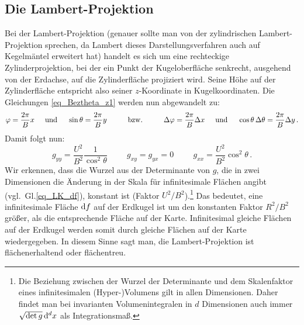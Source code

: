 \subsection{Die Lambert-Projektion}
\label{sec_Lambert}

Bei der Lambert-Projektion 
(genauer sollte man von der zylindrischen Lambert-Projektion sprechen, da Lambert
dieses Darstellungsverfahren auch auf Kegelm\"antel erweitert hat) 
handelt es sich um eine rechteckige Zylinderprojektion, bei der ein Punkt
der Kugeloberfl\"ache senkrecht, ausgehend von der Erdachse, auf die Zylinderfl\"ache projiziert wird. 
Seine H\"ohe auf der Zylinderfl\"ache entspricht also seiner $z$-Koordinate in Kugelkoordinaten. 
Die Gleichungen \ref{eq_Beztheta_z1} werden nun abgewandelt zu:
\begin{equation}
\label{eq_Beztheta_z2}
         \varphi = \frac{2\pi}{B} x  \hspace{0.5cm} {\rm und} \hspace{0.5cm} 
         \sin \theta = \frac{2\pi}{B} y \hspace{1cm} {\rm bzw.} \hspace{1cm}
        \Delta \varphi = \frac{2\pi}{B} \Delta x \hspace{0.5cm} {\rm und} \hspace{0.5cm}  
        \cos \theta \, \Delta \theta = \frac{2\pi}{B} \Delta y  \, .
\end{equation}
Damit folgt nun:
\begin{equation}
         g_{yy} = \frac{U^2}{B^2} \frac{1}{\cos^2 \theta} \hspace{1cm}   g_{xy} = g_{yx} = 0 
         \hspace{1cm}  g_{xx} = \frac{U^2}{B^2} \cos^2 \theta \, .
\end{equation}
Wir erkennen, dass die Wurzel aus der Determinante von $g$, die in zwei Dimensionen die \"Anderung in
der Skala f\"ur infinitesimale Fl\"achen angibt (vgl.\ Gl.\ref{eq_LK_df}), 
konstant ist (Faktor $U^2/B^2$).\footnote{Die Beziehung zwischen der Wurzel der Determinante und
dem Skalenfaktor eines infinitesimalen (Hyper-)Volumens gilt in allen Dimensionen. Daher findet man
bei invarianten Volumenintegralen in $d$ Dimensionen auch immer $\sqrt{{\rm det}\,g}\,{\rm d}^dx$ als
Integrationsma\ss.} 
Das bedeutet, eine
infinitesimale Fl\"ache ${\rm d}f$ auf der Erdkugel ist um den konstanten Faktor $R^2/B^2$ gr\"o\ss er, als
die entsprechende Fl\"ache auf der Karte. Infinitesimal gleiche Fl\"achen auf der Erdkugel werden somit durch
gleiche Fl\"achen auf der Karte wiedergegeben. In diesem Sinne sagt man, die Lambert-Projektion
ist fl\"achenerhaltend oder fl\"achentreu.


